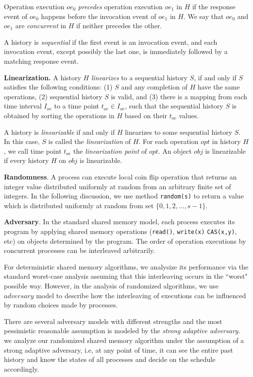 Operation execution $oe_0$ \emph{precedes} operation execution $oe_1$ in $H$ if the response event of
$oe_0$ happens before the invocation event of $oe_1$ in $H$.
We say that $oe_0$ and $oe_1$ are \emph{concurrent} in $H$ if neither precedes the other.

A history is \emph{sequential} if the first event is an invocation event, and each invocation event, except
possibly the last one, is immediately followed by a matching response event.

\textbf{Linearization.}
A history $H$ \emph{linearizes} to a sequential history $S$, if and only if $S$ satisfies the
following conditions: (1) $S$ and any completion of $H$ have the same operations, (2) sequential history $S$ is
valid, and (3) there is a mapping from each time interval $I_{oe}$ to a time point $t_{oe} \in I_{oe}$, such
that the sequential history $S$ is obtained by sorting the operations in $H$ based on their $t_{oe}$ values.

A history is \emph{linearizable} if and only if $H$ linearizes to some sequential history $S$. In this case,
$S$ is called the \emph{linearization} of $H$. For each operation $opt$ in history $H$, we call time point $t_{oe}$
the \emph{linearization point} of $opt$. An object $obj$ is linearizable if every history $H$ on $obj$ is linearizable.

\textbf{Randomness}.
A process can execute local coin flip operation that returns an integer value distributed
uniformly at random from an arbitrary finite set of integers. In the following discussion, we use method
\texttt{random(s)} to return a value which is distributed uniformly at random from set $\{0, 1, 2,..., s-1\}$.

\textbf{Adversary}.
In the standard shared memory model, each process executes its program by applying
shared memory operations (\texttt{read()}, \texttt{write(x)}
\texttt{CAS(x,y)}, etc) on objects determined by the program. The order of operation executions
by concurrent processes
can be interleaved arbitrarily.

For deterministic shared memory algorithms, we analysize its performance via the standard  worst-case analysis assuming that
this interleaving occurs in the ``worst" possible way. However, in the analysis of randomized algorithms, we use
$adversary$ model to describe how the interleaving of executions can be influenced by random choices
made by processes.

There are several adversary models with different strengths
and
the most pessimistic reasonable assumption is modeled by the \emph{strong adaptive adversary}. we analyze
our randomized shared memory algorithm under the assumption of a strong adaptive adversary, i.e, at any
point of time, it can see the entire past history and know the states of all processes and decide on
the schedule accordingly.
